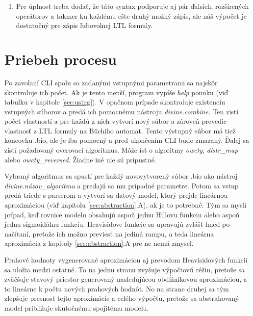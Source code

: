 \documentclass[11pt,final,oneside]{fithesis}
\begin{document}
\begin{enumerate}
\begin{itemize}
disjunkcia), {\bf ->} (implik\'acia), {\bf <->} (ekvivalencia)) a premenn\'ymi definovan\'ymi na za\v ciatku s\'uboru.
\item Syntax podporuje aj \v lubovolne vnoren\'e gu\v lat\'e  z\'atvorky.
\end{itemize}
\item Pre \'uplnos\v t treba doda\v t, \v ze t\'ato syntax podporuje aj p\'ar \v dals\'ich, roz\v s\'iren\'ych oper\'atorov a takmer ku ka\v zd\'emu e\v ste
druh\'y mo\v zn\'y z\'apis, ale n\'a\v s v\'ypo\v cet je dostato\v cn\'y pre z\'apis \v lubovolnej LTL formuly.
\end{enumerate}

\section{Priebeh procesu}
Po zavolan\'i CLI spolu so zadan\'ymi vstupn\'ymi parametrami sa najsk\^ or skontroluje ich po\v cet. Ak je tento men\v s\'i, program vyp\'i\v se \textit{help}
ponuku (vi\v d tabu\v lku v kapitole \ref{sec:using}). V opa\v cnom pr\'ipade skontroluje existenciu vstupn\'ych s\'uborov a pred\'a ich pomocn\'emu n\'astroju {\it divine.combine}.
Ten zist\'i po\v cet vlastnost\'i a pre ka\v zd\'u z nich vytvor\'i nov\'y s\'ubor a z\'arove\v n prevedie vlastnos\v t z LTL formuly na B\"uchiho automat. 
Tento v\'ystupn\'y s\'ubor m\'a tie\v z koncovku .bio, ale je iba pomocn\'y a pred ukon\v cen\'im CLI bude zmazan\'y. \v Dalej sa zist\'i po\v zadovan\'y 
overovac\'i algoritmus. M\^ o\v ze \'is\v t o algoritmy {\it owcty}, {\it distr\_map} alebo {\it owcty\_reversed}. \v Ziadne in\'e nie s\'u pr\'ipustn\'e.

Vybran\'y algoritmus sa spust\'i pre ka\v zd\'y novovytvoren\'y s\'ubor .bio ako n\'astroj {\it divine.n\'azov\_algoritmu} a predaj\'u sa mu pr\'ipadn\'e 
parametre. Potom sa vstup pred\'a triede s parserom a vytvor\'i sa datov\'y model, ktor\'y prejde line\'arnou aproxim\'aciou (vi\v d kapitolu 
\ref{sec:abstraction}.A), ak je to potrebn\'e. T\'ym sa
mysl\'i pr\'ipad, ke\v d rovnice modelu obsahuj\'u aspo\v n jednu Hillovu funkciu alebo aspo\v n jednu sigmoid\'alnu funkciu. Heavisidove funkcie sa 
upravuj\'u zvl\'a\v s\v t hne\v d po na\v c\'itan\'i, preto\v ze ich mo\v zno previes\v t na jedin\'u rampu, a teda line\'arna aproxim\'acia z kapitoly
\ref{sec:abstraction}.A pre ne nem\'a zmysel. 

Prahov\'e hodnoty vygenerovan\'e aproxim\'aciou aj prevodom Heavisidov\'ych funkci\'i sa ulo\v zia medzi ostatn\'e. To na jednu stranu zvy\v suje 
v\'ypo\v ctov\'u r\'e\v ziu, preto\v ze sa zv\" a\v c\v suje stavov\'y priestor generovan\'y nasleduj\'ucou obd\'l\v znikovou aproxim\'aciou, a to line\'arne 
k po\v ctu nov\'ych prahov\'ych hodn\^ ot. No na strane druhej sa t\'ym zlep\v suje presnos\v t tejto aproxim\'acie a cel\'eho v\'ypo\v ctu, preto\v ze sa 
abstrahovan\'y model pribli\v zuje skuto\v cn\'emu spojit\'emu modelu.
\end{document}

